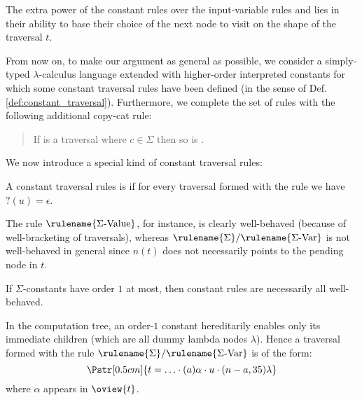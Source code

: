 \begin{remark}
The extra power of the constant rules over the input-variable rules
 and  lies in their
ability to base their choice of the next node to visit on
the shape of the traversal $t$.
\end{remark}

From now on, to make our argument as general as possible, we
consider a simply-typed $\lambda$-calculus language extended with
higher-order interpreted constants for which some constant traversal
rules have been defined (in the sense of Def.
\ref{def:constant_traversal}). Furthermore, we complete the set of
rules with the following additional copy-cat rule:
\begin{quote}
 If  is a
traversal where $c\in\Sigma$ then so is .
\end{quote}


We now introduce a special kind of constant traversal rules:
\begin{definition}
\label{def:wellbehaved_traversal} A constant traversal rules is
     if
    for every traversal   formed with the rule
    we have $?(u) = \epsilon$.
\end{definition}

The rule $\rulename{\Sigma\mbox{-Value}}$, for instance, is clearly
well-behaved (because of well-bracketing of traversals), whereas
$\rulename{\Sigma}/\rulename{\Sigma\mbox{-Var}}$ is not well-behaved
in general since $n(t)$ does not necessarily points to the pending
node in $t$.

\begin{lemma}
\label{lem:sigma_order1_are_wellbehaved} If $\Sigma$-constants have
order $1$ at most, then constant rules are necessarily all
well-behaved.
\end{lemma}
\proof In the computation tree, an order-$1$ constant hereditarily
enables only its immediate children (which are all dummy lambda
nodes $\lambda$). Hence a traversal formed with the rule
$\rulename{\Sigma}/\rulename{\Sigma\mbox{-Var}}$ is of the form:
$$\Pstr[0.5cm]{ t = \ldots \cdot (a){\alpha} \cdot u \cdot
 (n-a,35){\lambda}}$$
where $\alpha$ appears in $\oview{t}$.

